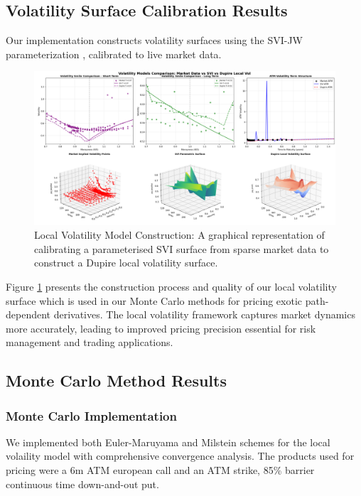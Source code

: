 \documentclass[11pt,a4paper]{article}
\begin{document}
\subsection{Volatility Surface Calibration Results}

Our implementation constructs volatility surfaces using the SVI-JW parameterization \cite{Gatheral2014}, calibrated to live market data.

\begin{figure}[H]
\centering
\includegraphics[width=\textwidth]{../charts/Local Vol Charts/volatility_models_comparison_cropped.png}
\caption{Local Volatility Model Construction: A graphical representation of calibrating a parameterised SVI surface from sparse market data to construct a Dupire local volatility surface.}
\label{fig:volatility_comparison}
\end{figure}

Figure \ref{fig:volatility_comparison} presents the construction process and quality of our local volatility surface which is used in our Monte Carlo methods for pricing exotic path-dependent derivatives. The local volatility framework captures market dynamics more accurately, leading to improved pricing precision essential for risk management and trading applications.

\subsection{Monte Carlo Method Results}

\subsubsection{Monte Carlo Implementation}

We implemented both Euler-Maruyama and Milstein schemes for the local volaility model with comprehensive convergence analysis. The products used for pricing were a 6m ATM european call and an ATM strike, 85\% barrier continuous time down-and-out put.
\end{document}

